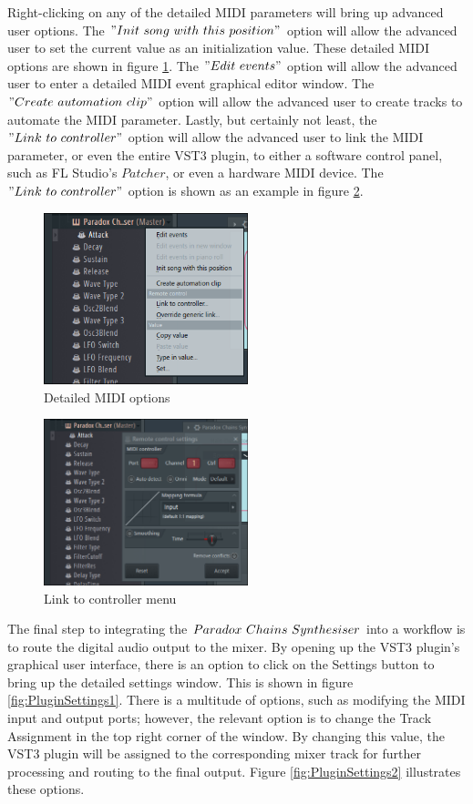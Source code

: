 \documentclass[a4paper,12pt]{report}
\begin{document}
Right-clicking on any of the detailed MIDI parameters will bring up advanced user options. The $"Init\ \-song\ \-with\ \-this\ \-position"$ option will allow the advanced user to set the current value as an initialization value. These detailed MIDI options are shown in figure \ref{fig:ExtraOptions01}. The $"Edit\ \-events"$ option will allow the advanced user to enter a detailed MIDI event graphical editor window. The $"Create\ \-automation\ \-clip"$ option will allow the advanced user to create tracks to automate the MIDI parameter. Lastly, but certainly not least, the $"Link\ \-to\ \-controller"$ option will allow the advanced user to link the MIDI parameter, or even the entire VST3 plugin, to either a software control panel, such as FL Studio's $Patcher$, or even a hardware MIDI device. The $"Link\ \-to\ \-controller"$ option is shown as an example in figure \ref{fig:ExtraOptions02}.

\begin{figure}[h]
\centering
    \includegraphics[width=16em]{ExtraOptions01.png}
    \caption{Detailed MIDI options}     \label{fig:ExtraOptions01}
\end{figure}
\begin{figure}[h]
\centering
    \includegraphics[width=16em]{ExtraOptions02.png}
    \caption{Link to controller menu}     \label{fig:ExtraOptions02}
\end{figure}

The final step to integrating the $Paradox\ \-Chains\ \-Synthesiser$ into a workflow is to route the digital audio output to the mixer. By opening up the VST3 plugin's graphical user interface, there is an option to click on the Settings button to bring up the detailed settings window. This is shown in figure \ref{fig:PluginSettings1}. There is a multitude of options, such as modifying the MIDI input and output ports; however, the relevant option is to change the Track Assignment in the top right corner of the window. By changing this value, the VST3 plugin will be assigned to the corresponding mixer track for further processing and routing to the final output. Figure \ref{fig:PluginSettings2} illustrates these options.
\end{document}
